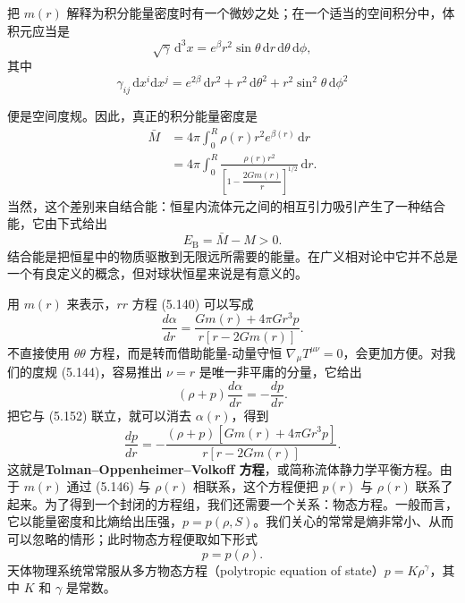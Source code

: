 把 $m(r)$ 解释为积分能量密度时有一个微妙之处；在一个适当的空间积分中，体积元应当是
\begin{equation*}
\sqrt{\gamma}\,\mathrm{d}^3x = e^{\beta}r^2\sin\theta\,\mathrm{d}r\,\mathrm{d}\theta\,\mathrm{d}\phi,
\tag{5.148}
\end{equation*}
其中
\begin{equation*}
\gamma_{ij}\,\mathrm{d}x^i\mathrm{d}x^j = e^{2\beta}\,\mathrm{d}r^2 + r^2\,\mathrm{d}\theta^2 + r^2\sin^2\theta\,\mathrm{d}\phi^2
\tag{5.149}
\end{equation*}

便是空间度规。因此，真正的积分能量密度是
\begin{align*}
\bar{M} &= 4\pi\int_0^R \rho(r)r^2 e^{\beta(r)}\,\mathrm{d}r\\
&= 4\pi\int_0^R \frac{\rho(r)r^2}{\left[1 - \dfrac{2Gm(r)}{r}\right]^{1/2}}\,\mathrm{d}r.
\tag{5.150}
\end{align*}
当然，这个差别来自结合能：恒星内流体元之间的相互引力吸引产生了一种结合能，它由下式给出
\begin{equation*}
E_{\mathrm{B}} = \bar{M} - M > 0.
\tag{5.151}
\end{equation*}
结合能是把恒星中的物质驱散到无限远所需要的能量。在广义相对论中它并不总是一个有良定义的概念，但对球状恒星来说是有意义的。

用 $m(r)$ 来表示，$rr$ 方程 (5.140) 可以写成
\begin{equation*}
\frac{d\alpha}{dr} = \frac{Gm(r) + 4\pi G r^3 p}{r\left[r - 2Gm(r)\right]}.
\tag{5.152}
\end{equation*}
不直接使用 $\theta\theta$ 方程，而是转而借助能量-动量守恒 $\nabla_\mu T^{\mu\nu} = 0$，会更加方便。对我们的度规 (5.144)，容易推出 $\nu = r$ 是唯一非平庸的分量，它给出
\begin{equation*}
(\rho + p)\frac{d\alpha}{dr} = -\frac{dp}{dr}.
\tag{5.153}
\end{equation*}
把它与 (5.152) 联立，就可以消去 $\alpha(r)$，得到
\begin{equation*}
\frac{dp}{dr} = -\frac{(\rho + p)\left[Gm(r) + 4\pi G r^3 p\right]}{r\left[r - 2Gm(r)\right]}.
\tag{5.154}
\end{equation*}
这就是\textbf{Tolman--Oppenheimer--Volkoff 方程}，或简称流体静力学平衡方程。由于 $m(r)$ 通过 (5.146) 与 $\rho(r)$ 相联系，这个方程便把 $p(r)$ 与 $\rho(r)$ 联系了起来。为了得到一个封闭的方程组，我们还需要一个关系：物态方程。一般而言，它以能量密度和比熵给出压强，$p = p(\rho, S)$。我们关心的常常是熵非常小、从而可以忽略的情形；此时物态方程便取如下形式
\begin{equation*}
p = p(\rho).
\tag{5.155}
\end{equation*}
天体物理系统常常服从多方物态方程（polytropic equation of state）$p = K\rho^{\gamma}$，其中 $K$ 和 $\gamma$ 是常数。

